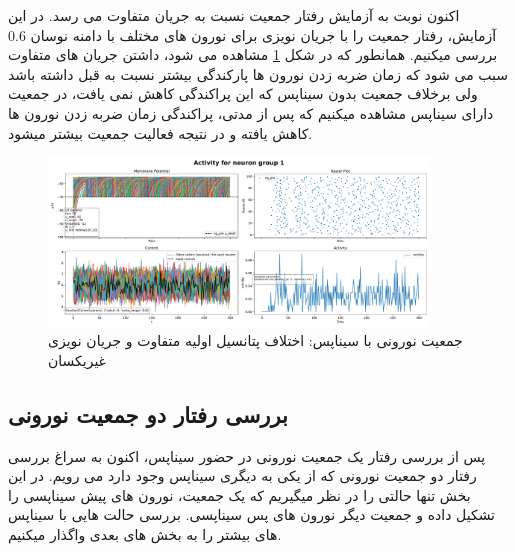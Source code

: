 \documentclass{report}
\begin{document}
        اکنون نوبت به آزمایش رفتار جمعیت نسبت به جریان متفاوت می رسد. در این آزمایش، رفتار جمعیت را با جریان نویزی برای نورون های مختلف با دامنه نوسان 0.6 بررسی میکنیم. همانطور که در شکل
        \ref{fig:part1-simple-ng-with-synapse-diff-curr}
        مشاهده می شود، داشتن جریان های متفاوت سبب می شود که زمان ضربه زدن نورون ها پارکندگی بیشتر نسبت به قبل داشته باشد ولی برخلاف جمعیت بدون سیناپس که این پراکندگی کاهش نمی یافت، در جمعیت دارای سیناپس مشاهده میکنیم که پس از مدتی، پراکندگی زمان ضربه زدن نورون ها کاهش یافته و در نتیجه فعالیت جمعیت بیشتر میشود.
        \begin{figure}[!ht]
            \centering
            \includegraphics[width=0.9\textwidth]{plots/part1-Simple-ng-with-synapse-diff-curr.pdf} 
            \caption{جمعیت نورونی با سیناپس: اختلاف پتانسیل اولیه متفاوت و جریان نویزی غیریکسان}
            \label{fig:part1-simple-ng-with-synapse-diff-curr}
        \end{figure}

    \subsection{بررسی رفتار دو جمعیت نورونی}
        پس از بررسی رفتار یک جمعیت نورونی در حضور سیناپس، اکنون به سراغ بررسی رفتار دو جمعیت نورونی که از یکی به دیگری سیناپس وجود دارد می رویم. در این بخش تنها حالتی را در نظر میگیریم که یک جمعیت، نورون های پیش سیناپسی را تشکیل داده و جمعیت دیگر نورون های پس سیناپسی. بررسی حالت هایی با سیناپس های بیشتر را به بخش های بعدی واگذار میکنیم.
\end{document}

